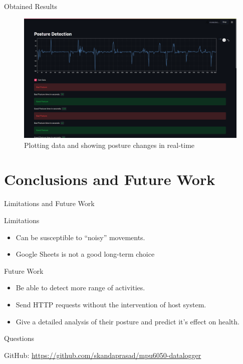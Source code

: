 \documentclass[aspectratio=169,xcolor=dvipsnames]{beamer}
\begin{document}
\begin{frame}{Obtained Results}
    \begin{figure}
        \centering
        \includegraphics[scale=0.18]{webappss2.png}
        \caption{Plotting data and showing posture changes in real-time}
        \label{fig:results}
    \end{figure}

\end{frame}

\section{Conclusions and Future Work}

\begin{frame}{Limitations and Future Work}
    \begin{block}{Limitations}
        \begin{itemize}
            \item Can be susceptible to ``noisy'' movements.
            \item Google Sheets is not a good long-term choice
        \end{itemize}
    \end{block}
    \begin{block}{Future Work}
        \begin{itemize}
            \item Be able to detect more range of activities.
            \item Send HTTP requests without the intervention of host system.
            \item Give a detailed analysis of their posture and predict it's
                effect on health.
        \end{itemize}

    \end{block}
\end{frame}

\begin{frame}
         \Huge{\centerline{Questions}}
	 \vspace{1cm}
	{\large \centerline{GitHub: \url{https://github.com/skandaprasad/mpu6050-datalogger}}}	
\end{frame}
\end{document}
